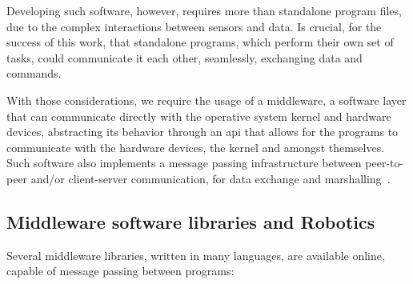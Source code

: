 Developing such software, however, requires more than standalone program files, due to the complex interactions between sensors and data. Is crucial, for the success of this work, that standalone programs, which perform their own set of tasks, could communicate it each other, seamlessly, exchanging data and commands.

With those considerations, we require the usage of a middleware, a software layer that can communicate directly with the operative system kernel and hardware devices, abstracting its behavior through an \ac{api} that allows for the programs to communicate with the hardware devices, the kernel and amongst themselves\cite{Etzkorn2017, Huang2010}. Such software also implements a message passing infrastructure between peer-to-peer and/or client-server communication, for data exchange and marshalling~\cite{Etzkorn2017}.

\subsection{Middleware software libraries and Robotics} 
Several middleware libraries, written in many languages, are available online, capable of message passing between programs:

